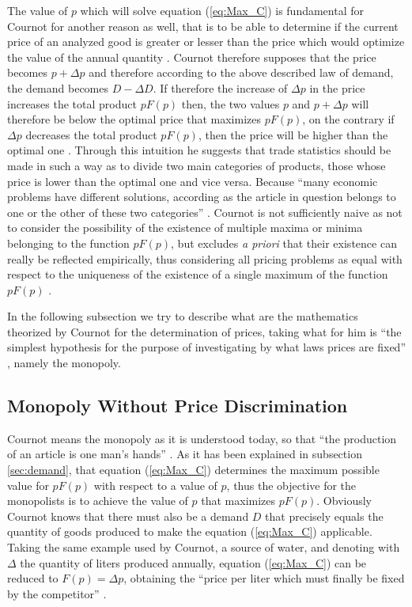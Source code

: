 \documentclass[12pt]{article}
\numberwithin{equation}{subsection}
\let\oldsubsection\subsection%
\renewcommand{\subsection}{%
  \renewcommand{\theequation}{\thesubsection.\arabic{equation}}%
  \oldsubsection}%
\begin{document}
The value of $p$ which will solve equation (\ref{eq:Max_C}) is fundamental for Cournot for another reason as well, that is to be able to determine if the current price of an analyzed good is greater or lesser than the price which would optimize the value of the annual quantity \cite[p. 53]{cournot1897researches}. Cournot therefore supposes that the price becomes $p + \Delta p$ and therefore according to the above described law of demand, the demand becomes $D - \Delta D$. If therefore the increase of $\Delta p$ in the price increases the total product $pF(p)$ then, the two values $p$ and $p + \Delta p$ will therefore be below the optimal price that maximizes $pF(p)$, on the contrary if $\Delta p$ decreases the total product $pF(p)$, then the price will be higher than the optimal one \citep[p. 53-54]{cournot1897researches}. Through this intuition he suggests that trade statistics should be made in such a way as to divide two main categories of products, those whose price is lower than the optimal one and vice versa. Because ``many economic problems have different solutions, according as the article in question belongs to one or the other of these two categories'' \cite[p. 54]{cournot1897researches}. Cournot is not sufficiently naive as not to consider the possibility of the existence of multiple maxima or minima belonging to the function $pF(p)$, but excludes \emph{a priori} that their existence can really be reflected empirically, thus considering all pricing problems as equal with respect to the uniqueness of the existence of a single maximum of the function $pF(p)$ \citep[p. 55]{cournot1897researches}. 

In the following subsection we try to describe what are the mathematics theorized by Cournot for the determination of prices, taking what for him is ``the simplest hypothesis for the purpose of investigating by what laws prices are fixed'' \cite[p. 55]{cournot1897researches}, namely the monopoly.
\subsection{Monopoly Without Price Discrimination}
\label{sec:mono}
Cournot means the monopoly as it is understood today, so that ``the production of an article is one man's hands'' \cite[p. 55]{cournot1897researches}. As it has been explained in subsection \ref{sec:demand}, that equation (\ref{eq:Max_C}) determines the maximum possible value for $pF(p)$ with respect to a value of $p$, thus the objective for the monopolists is to achieve the value of $p$ that maximizes $pF(p)$. Obviously Cournot knows that there must also be a demand $D$ that precisely equals the quantity of goods produced to make the equation (\ref{eq:Max_C}) applicable. Taking the same example used by Cournot, a source of water, and denoting with $\Delta$ the quantity of liters produced annually, equation (\ref{eq:Max_C}) can be reduced to $F(p) = \Delta p$, obtaining the ``price per liter which must finally be fixed by the competitor'' \cite[p. 57]{cournot1897researches}.
\end{document}
